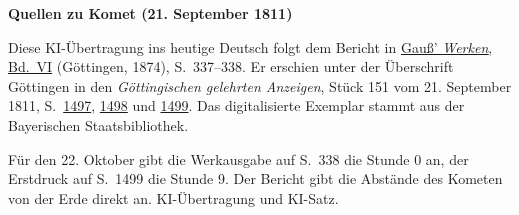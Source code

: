 \clearpage\thispagestyle{empty}
\begin{center}\textbf{Quellen zu Komet (21. September 1811)}\end{center}
\noindent Diese KI-Übertragung ins heutige Deutsch folgt dem Bericht in \href{https://gdz.sub.uni-goettingen.de/id/PPN236007467}{Gauß’ \textit{Werken}, Bd.~VI} (Göttingen, 1874), S.~337--338. Er erschien unter der Überschrift Göttingen in den \textit{Göttingischen gelehrten Anzeigen}, Stück 151 vom 21. September 1811, S.~\href{https://api.digitale-sammlungen.de/iiif/image/v2/bsb10538680_00473/full/1600,/0/default.jpg}{1497}, \href{https://api.digitale-sammlungen.de/iiif/image/v2/bsb10538680_00474/full/1600,/0/default.jpg}{1498} und \href{https://api.digitale-sammlungen.de/iiif/image/v2/bsb10538680_00475/full/1600,/0/default.jpg}{1499}. Das digitalisierte Exemplar stammt aus der Bayerischen Staatsbibliothek.
\par\smallskip\noindent Für den 22. Oktober gibt die Werkausgabe auf S.~338 die Stunde 0 an, der Erstdruck auf S.~1499 die Stunde 9. Der Bericht gibt die Abstände des Kometen von der Erde direkt an. KI-Übertragung und KI-Satz.
\clearpage
